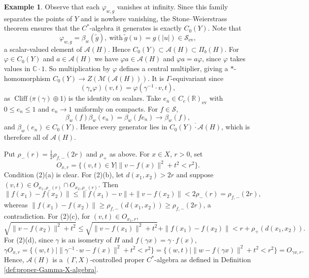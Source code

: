 \documentclass[pdflatex]{sn-jnl}
\theoremstyle{plain}
\theoremstyle{definition}
\newtheorem{example}[theorem]{Example}
\begin{document}
\begin{example}
Observe that each $\varphi_{w,g}$ vanishes at infinity. Since this family separates the points of $Y$ and is nowhere vanishing, the Stone--Weierstrass theorem ensures that the $C^{*}$-algebra it generates is exactly $C_{0}(Y)$.
Note that
\[
\varphi_{w,g}=\beta_w(\tilde g),\ \text{with}\ \tilde g(u)=g(|u|)\in\mathcal{S}_{\mathrm{ev}},
\]
a scalar-valued element of $\mathcal{A}(H)$. Hence $C_0(Y)\subset\mathcal{A}(H)\subset\Pi_b(H)$. For $\varphi\in C_{0}(Y)$ and $a\in\mathcal{A}(H)$ we have $\varphi a\in\mathcal{A}(H)$ and $\varphi a=a\varphi$, since $\varphi$ takes values in $\mathbb C\cdot1$. So multiplication by $\varphi$ defines a central multiplier, giving a $*$-homomorphism $C_{0}(Y)\to Z(\mathcal{M}(\mathcal{A}(H)))$. It is $\Gamma$-equivariant since
\[(\gamma_{*}\varphi)(v,t)=\varphi(\gamma^{-1}\cdot v,t),
\]
as $\operatorname{Cliff}\bigl(\pi(\gamma)\oplus 1\bigr)$ is the identity on scalars.
Take $e_n\in C_c(\mathbb R)_{\mathrm{ev}}$ with $0\le e_n\le1$ and $e_n\to 1$ uniformly on compacts. For $f\in\mathcal S$,
\[\beta_w(f)\beta_w(e_n)=\beta_w(fe_n)\to\beta_w(f),
\]
and $\beta_w(e_n)\in C_0(Y)$. Hence every generator lies in $\overline{C_0(Y)\cdot\mathcal{A}(H)}$, which is therefore all of $\mathcal{A}(H)$.

Put $\rho_-(r)=\tfrac12\rho_{f,-}(2r)$ and $\rho_+$ as above. For $x\in X$, $r>0$, set
\[O_{x,r}=\bigl\{(v,t)\in Y\mid\|v-f(x)\|^2+t^{2}<r^{2}\bigr\}.
\]
Condition (2)(a) is clear.
For (2)(b), let $d(x_1,x_2)>2r$ and suppose $(v,t)\in O_{x_1,\rho_-(r)}\cap O_{x_2,\rho_-(r)}$. Then
\[
\|f(x_1)-f(x_2)\|\le\|f(x_1)-v\|+\|v-f(x_2)\|<2\rho_-(r)=\rho_{f,-}(2r),
\]
whereas $\|f(x_1)-f(x_2)\|\ge\rho_{f,-}(d(x_1,x_2))\ge\rho_{f,-}(2r)$, a contradiction.
For (2)(c), for $(v,t)\in O_{x_1,r}$,
\[
\sqrt{\|v-f(x_2)\|^2+t^2}\le\sqrt{\|v-f(x_1)\|^2+t^2}+\|f(x_1)-f(x_2)\|<r+\rho_{+}(d(x_1,x_2)).
\]
For (2)(d), since $\gamma$ is an isometry of $H$ and $f(\gamma x)=\gamma\cdot f(x)$,
\[
\gamma O_{x,r}=\{(w,t)\mid\|\gamma^{-1}\cdot w-f(x)\|^2+t^2<r^2\}=\{(w,t)\mid \|w-f(\gamma x)\|^2+t^2<r^2\}=O_{\gamma x,r}.
\]
Hence, $\mathcal{A}(H)$ is a $(\Gamma,X)$-controlled proper $C^*$-algebra as defined in Definition \ref{def:proper-Gamma-X-algebra}.
\end{example}
\end{document}
